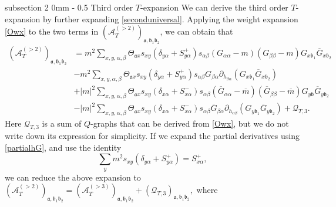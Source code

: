 \documentclass{article}
\makeatletter
\newcommand{\1}{\mathds{1}}
\numberwithin{equation}{section}
\newcommand{\al}{\alpha}
\newcommand{\be}{\begin{equation}}
\newcommand{\ee}{\end{equation}}
\newcommand{\fa}{{\mathfrak a}}
\newcommand{\fb}{{\mathfrak b}}
\renewcommand{\cal}{\mathcal}
\theoremstyle{plain} %
\theoremstyle{remark}
\newcommand{\AT}{\mathcal A_T}
\renewcommand{\subsection}{\@startsection
{subsection}%
{2}%
{0mm}%
{-\baselineskip}%
{0.5\baselineskip}%
{\normalfont\bf\itshape}} %
\makeatother
\begin{document}
\subsection{Third order $T$-expansion}
We can derive the third order $T$-expansion by further expanding \eqref{seconduniversal}. Applying the weight expansion \eqref{Owx} to the two terms in $ (\AT^{(>2)})_{\fa,\fb_1\fb_2} $, we can obtain that  %
\begin{align*}
  (\AT^{(>2)})_{\fa,\fb_1\fb_2} &=   m^2\sum_{x,y,\al,\beta}\Theta_{\fa x} s_{xy} \left( \delta_{y\al}+  S^+_{y\al}\right)s_{\al\beta}(G_{\al\al}-m)(G_{\beta\beta}-m) G_{x \fb_1}\overline G_{x\fb_2} \\
&-m^2 \sum_{x,y,\al,\beta} \Theta_{\fa x} s_{xy}\left(\delta_{y\al}+S^+_{y\al}\right)s_{\al\beta}G_{\beta \al}\partial_{ h_{\beta\al}}(G_{x \fb_1}\overline G_{x \fb_2}) \\
&+ |m|^2 \sum_{x,y,\al,\beta} \Theta_{\fa x} s_{xy}\left( \delta_{x\al} + S^-_{x\al} \right)s_{\al\beta}( \overline G_{\al\al} - \overline m)( \overline G_{\beta\beta} - \overline m) G_{y \fb}\overline G_{y\fb_2}\\
& - |m|^2 \sum_{x,y,\al,\beta} \Theta_{\fa x} s_{xy} \left(\delta_{x\al}+S^-_{x\al}\right)s_{\al\beta}\overline G_{\beta\al} \partial_{h_{\al\beta}}( G_{y \fb_1}\overline G_{y\fb_2} )+\cal Q_{T,3} .
\end{align*}
Here $\cal Q_{T,3}$ is a sum of $Q$-graphs that can be derived from \eqref{Owx}, but we do not write down its expression for simplicity. If we expand the partial derivatives using \eqref{partialhG}, and use the identity 
\be\label{iden_S+}\sum_y m^2 s_{xy}\left(\delta_{y\al}+S^+_{y\al}\right) = S^+_{x\al},\ee  
we can reduce the above expansion to $(\AT^{(>2)})_{\fa,\fb_1\fb_2} =(\AT^{(>3)})_{\fa,\fb_1\fb_2} + (\cal Q_{T,3})_{\fa,\fb_1\fb_2},$ where
\end{document}
